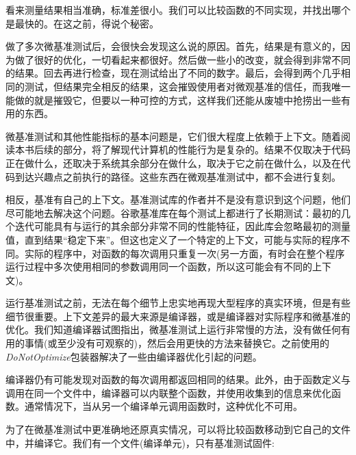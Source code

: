 看来测量结果相当准确，标准差很小。我们可以比较函数的不同实现，并找出哪个是最快的。在这之前，得说个秘密。


做了多次微基准测试后，会很快会发现这么说的原因。首先，结果是有意义的，因为做了很好的优化，一切看起来都很好。然后做一些小的改变，就会得到非常不同的结果。回去再进行检查，现在测试给出了不同的数字。最后，会得到两个几乎相同的测试，但结果完全相反的结果，这会摧毁使用者对微观基准的信任，而我唯一能做的就是摧毁它，但要以一种可控的方式，这样我们还能从废墟中抢捞出一些有用的东西。

微基准测试和其他性能指标的基本问题是，它们很大程度上依赖于上下文。随着阅读本书后续的部分，将了解现代计算机的性能行为是复杂的。结果不仅取决于代码正在做什么，还取决于系统其余部分在做什么，取决于它之前在做什么，以及在代码到达兴趣点之前执行的路径。这些东西在微观基准测试中，都不会进行复刻。

相反，基准有自己的上下文。基准测试库的作者并不是没有意识到这个问题，他们尽可能地去解决这个问题。谷歌基准库在每个测试上都进行了长期测试：最初的几个迭代可能具有与运行的其余部分非常不同的性能特征，因此库会忽略最初的测量值，直到结果“稳定下来”。但这也定义了一个特定的上下文，可能与实际的程序不同。实际的程序中，对函数的每次调用只重复一次(另一方面，有时会在整个程序运行过程中多次使用相同的参数调用同一个函数，所以这可能会有不同的上下文)。

运行基准测试之前，无法在每个细节上忠实地再现大型程序的真实环境，但是有些细节很重要。上下文差异的最大来源是编译器，或是编译器对实际程序和微基准的优化。我们知道编译器试图指出，微基准测试上运行非常慢的方法，没有做任何有用的事情(或至少没有可观察的)，然后会用更快的方法来替换它。之前使用的\textit{DoNotOptimize}包装器解决了一些由编译器优化引起的问题。

编译器仍有可能发现对函数的每次调用都返回相同的结果。此外，由于函数定义与调用在同一个文件中，编译器可以内联整个函数，并使用收集到的信息来优化函数。通常情况下，当从另一个编译单元调用函数时，这种优化不可用。

为了在微基准测试中更准确地还原真实情况，可以将比较函数移动到它自己的文件中，并编译它。我们有一个文件(编译单元)，只有基准测试固件:


